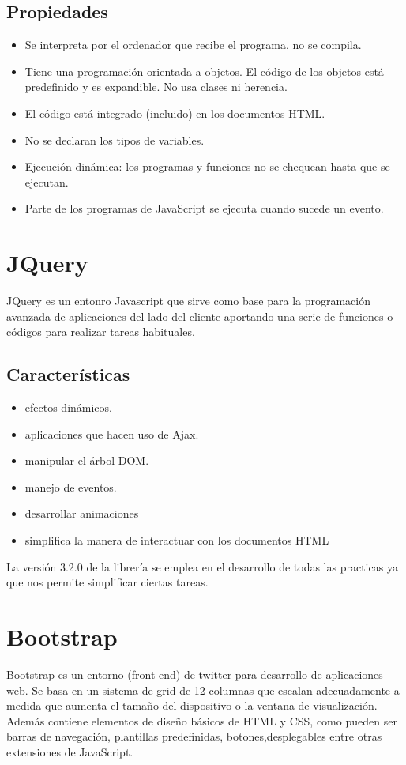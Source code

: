 \subsection*{Propiedades}
\begin{itemize}
\item Se interpreta por el ordenador que recibe el programa, no se compila.
\item Tiene una programación orientada a objetos. El código de los objetos está predefinido y es expandible. No usa clases ni herencia.
\item El código está integrado (incluido) en los documentos HTML.
\item No se declaran los tipos de variables.
\item Ejecución dinámica: los programas y funciones no se chequean hasta que se ejecutan.
\item Parte de los programas de JavaScript se ejecuta cuando sucede un evento. 
\end{itemize}
\section{JQuery}
JQuery \cite{jquery}\cite{jqueryOficial} es un entonro Javascript que sirve como base para la programación avanzada  de aplicaciones del lado del cliente aportando una serie de funciones o códigos para realizar tareas habituales.
\subsection*{Características}
\begin{itemize}
\item efectos dinámicos.
\item aplicaciones que hacen uso de Ajax.
\item manipular el árbol DOM.
\item manejo de eventos.
\item desarrollar animaciones
\item simplifica la manera de interactuar con los documentos HTML
\end{itemize}
La versión 3.2.0 de la librería se emplea en el desarrollo de todas las practicas ya que nos permite simplificar ciertas tareas.
\section{Bootstrap}
Bootstrap \cite{bootstrap}\cite{bootstrapOfi} es un entorno (front-end) de twitter para desarrollo de aplicaciones web. Se basa en un sistema de grid de 12 columnas que escalan adecuadamente a medida que aumenta el tamaño del dispositivo o la ventana de visualización. Además contiene elementos de diseño básicos de HTML y CSS, como pueden ser barras de navegación, plantillas predefinidas, botones,desplegables entre otras extensiones de JavaScript.
